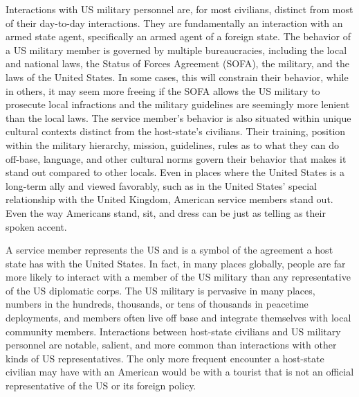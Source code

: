 {	Interactions with US military personnel are, for most civilians, distinct from most of their day-to-day interactions. They are fundamentally an interaction with an armed state agent, specifically an armed agent of a foreign state. The behavior of a US military member is governed by multiple bureaucracies, including the local and national laws, the Status of Forces Agreement (SOFA), the military, and the laws of the United States. In some cases, this will constrain their behavior, while in others, it may seem more freeing if the SOFA allows the US military to prosecute local infractions and the military guidelines are seemingly more lenient than the local laws. The service member's behavior is also situated within unique cultural contexts distinct from the host-state's civilians. Their training, position within the military hierarchy, mission, guidelines, rules as to what they can do off-base, language, and other cultural norms govern their behavior that makes it stand out compared to other locals. Even in places where the United States is a long-term ally and viewed favorably, such as in the United States' special relationship with the United Kingdom, American service members stand out. Even the way Americans stand, sit, and dress can be just as telling as their spoken accent. 

	
A service member represents the US and is a symbol of the agreement a host state has with the United States. In fact, in many places globally, people are far more likely to interact with a member of the US military than any representative of the US diplomatic corps. The US military is pervasive in many places, numbers in the hundreds, thousands, or tens of thousands in peacetime deployments, and members often live off base and integrate themselves with local community members. Interactions between host-state civilians and US military personnel are notable, salient, and more common than interactions with other kinds of US representatives. The only more frequent encounter a host-state civilian may have with an American would be with a tourist that is not an official representative of the US or its foreign policy.
	
}
